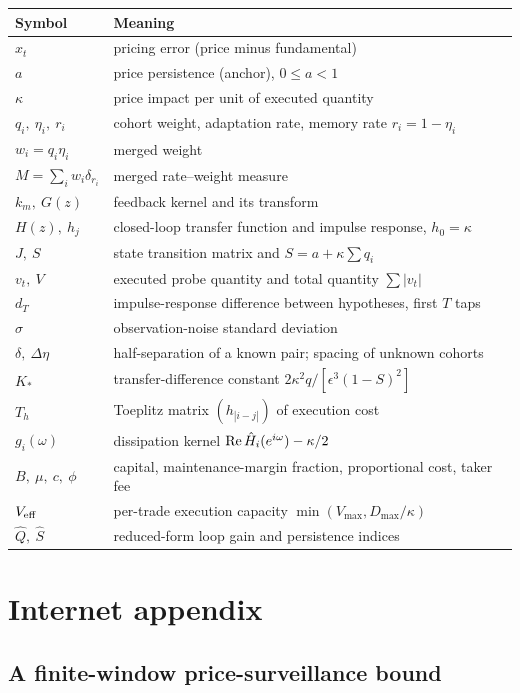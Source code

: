 \begin{longtable}{p{}p{}}
\toprule
Symbol & Meaning\\
\midrule
\endhead
$x_t$ & pricing error (price minus fundamental)\\
$a$ & price persistence (anchor), $0\le a<1$\\
$\kappa$ & price impact per unit of executed quantity\\
$q_i,\ \eta_i,\ r_i$ & cohort weight, adaptation rate, memory rate $r_i=1-\eta_i$\\
$w_i=q_i\eta_i$ & merged weight\\
$M=\sum_iw_i\delta_{r_i}$ & merged rate--weight measure\\
$k_m,\ G(z)$ & feedback kernel and its transform\\
$H(z),\ h_j$ & closed-loop transfer function and impulse response, $h_0=\kappa$\\
$J,\ S$ & state transition matrix and $S=a+\kappa\sum q_i$\\
$v_t,\ V$ & executed probe quantity and total quantity $\sum|v_t|$\\
$d_T$ & impulse-response difference between hypotheses, first $T$ taps\\
$\sigma$ & observation-noise standard deviation\\
$\delta,\ \Delta\eta$ & half-separation of a known pair; spacing of unknown cohorts\\
$K_*$ & transfer-difference constant $2\kappa^2q/[\epsilon^3(1-S)^2]$\\
$T_h$ & Toeplitz matrix $(h_{|i-j|})$ of execution cost\\
$g_i(\omega)$ & dissipation kernel ${\rm Re}\,\hat H_i(e^{i\omega})-\kappa/2$\\
$B,\ \mu,\ c,\ \phi$ & capital, maintenance-margin fraction, proportional cost, taker fee\\
$V_{\rm eff}$ & per-trade execution capacity $\min(V_{\max},D_{\max}/\kappa)$\\
$\hat Q,\ \hat S$ & reduced-form loop gain and persistence indices\\
\bottomrule
\end{longtable}

\section{Internet appendix}\label{app:ia}

\subsection{A finite-window price-surveillance bound}


